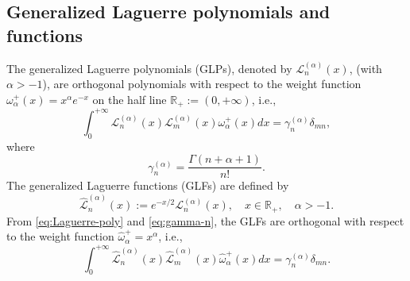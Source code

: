\documentclass[pdflatex,sn-aps]{sn-jnl}%
\theoremstyle{thmstyleone}%
\theoremstyle{thmstyletwo}%
\theoremstyle{thmstylethree}%
\begin{document}
\subsection{Generalized Laguerre polynomials and functions}
The generalized Laguerre polynomials (GLPs), denoted by $\mathscr{L}_n^{(\alpha)}(x)$,
(with $\alpha > -1$), are orthogonal polynomials with respect to the weight function
$\omega_\alpha^{+}(x)=x^\alpha e^{-x}$ on the half line $\mathbb{R}_{+}:=(0,+\infty)$,
i.e.,
\begin{equation}\label{eq:Laguerre-poly}
  \int_0^{+\infty} \mathscr{L}_n^{(\alpha)}(x) \mathscr{L}_m^{(\alpha)}(x) \omega_\alpha^{+}(x) d x=\gamma_n^{(\alpha)} \delta_{m n},
\end{equation}
where
\begin{equation}\label{eq:gamma-n}
  \gamma_n^{(\alpha)}=\frac{\Gamma(n+\alpha+1)}{n!}.
\end{equation}
The generalized Laguerre functions (GLFs) are defined by
\begin{equation}\label{eq:Laguerre-func}
  \widehat{\mathscr{L}}_n^{(\alpha)}(x):=e^{-x / 2} \mathscr{L}_n^{(\alpha)}(x), \quad x \in \mathbb{R}_{+}, \quad \alpha>-1 .
\end{equation}
From \eqref{eq:Laguerre-poly} and \eqref{eq:gamma-n}, the GLFs are orthogonal with respect to the weight function
$\hat{\omega}_\alpha^{+} = x^\alpha$, i.e.,
\begin{equation}\label{eq:Laguerre-func-orth}
  \int_0^{+\infty} \widehat{\mathscr{L}}_n^{(\alpha)}(x) \widehat{\mathscr{L}}_m^{(\alpha)}(x) \hat{\omega}_\alpha^{+}(x) d x=\gamma_n^{(\alpha)} \delta_{m n}.
\end{equation}
\end{document}
